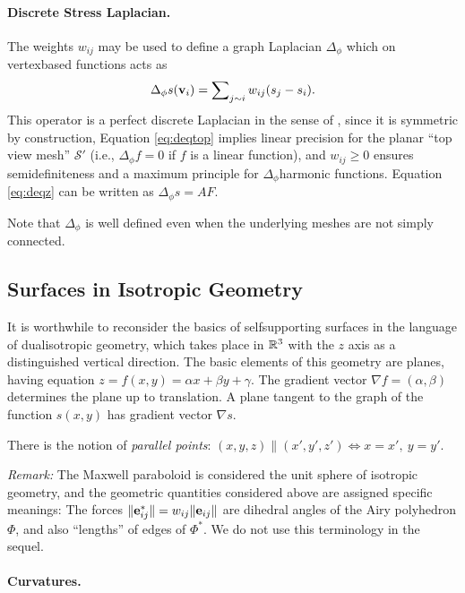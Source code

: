 \documentclass[review]{acmsiggraph}
\def\SS{{\mathcal S}}
\begin{document}
\paragraph{Discrete Stress Laplacian.}

The weights $w_{ij}$ may be used to define a graph Laplacian $\Delta_\phi$
which on vertex\dash based functions acts as
	\begin{align*}
	\Delta_{\phi} s({\mathbf v}_i)=\sum\nolimits_{j\sim i} w_{ij}(s_j-s_i).
	\end{align*}
 This operator is a perfect discrete Laplacian in the sense of
\cite{wardetzky07}, since it is symmetric by construction, Equation
\eqref{eq:deqtop} implies linear precision for the planar ``top view
mesh'' $\SS'$ (i.e., $\Delta_\phi f=0$ if $f$ is a linear function), and
$w_{ij}\ge 0$ ensures semidefiniteness and a maximum principle for
$\Delta_\phi$\dash harmonic functions. Equation \eqref{eq:deqz} can be
written as $\Delta_\phi s = AF$.

Note that $\Delta_\phi$ is well defined even when the underlying meshes
are not simply connected.

\subsection{Surfaces in Isotropic Geometry} \label{sec:smooth}

It is worthwhile to reconsider the basics of self\dash supporting surfaces
in the language of dual\dash isotropic geometry, which takes place in
${\mathbb R}^3$ with the $z$ axis as a distinguished vertical direction. The basic
elements of this geometry are planes, having equation $z=f(x,y) = \alpha
x+\beta y+\gamma$. The gradient vector $\nabla f = (\alpha,\beta)$
determines the plane up to translation. A plane tangent to the graph of
the function $s(x,y)$ has gradient vector $\nabla s$.

There is the notion of {\em parallel points}:
	$
	(x,y,z) \parallel (x',y',z') \iff
	x=x',\ y=y'
	.$

{\it Remark:} The Maxwell paraboloid is considered the unit sphere of isotropic
geometry, and the geometric quantities considered above are assigned
specific meanings: The forces $\|{\mathbf e}_{ij}^*\|=w_{ij}\|{\mathbf e}_{ij}\|$
are dihedral angles of the Airy polyhedron $\Phi$, and also ``lengths'' of
edges of $\Phi^*$. We do not use this terminology in the sequel.

\paragraph{Curvatures.}
\end{document}
